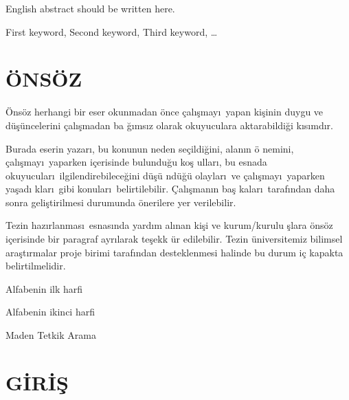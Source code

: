 \documentclass[fleqn,oneside]{akdenizuni}
\theoremstyle{plain}
\theoremstyle{definition}
\newenvironment{onsoz}[1][\"ONS\"OZ]{\chapter*{#1}}{}
\begin{document}
\begin{ozet}[english]
English abstract should be written here.

\begin{labeledminipage}[KEYWORDS:]
First keyword, Second keyword, Third keyword, \dots\ \ 
\end{labeledminipage}
\end{ozet}

\begin{onsoz}
\"{O}ns\"{o}z herhangi bir eser okunmadan \"{o}nce \c{c}al\i \c{s}may\i\
yapan ki\c{s}inin duygu ve d\"{u}\c{s}\"{u}ncelerini \c{c}al\i \c{s}madan ba%
\u{g}\i ms\i z olarak okuyuculara aktarabildi\u{g}i k\i s\i md\i r.

Burada eserin yazar\i , bu konunun neden se\c{c}ildi\u{g}ini, alan\i n \"{o}%
nemini, \c{c}al\i \c{s}may\i\ yaparken i\c{c}erisinde bulundu\u{g}u ko\c{s}%
ullar\i , bu esnada okuyucular\i\ ilgilendirebilece\u{g}ini d\"{u}\c{s}\"{u}%
nd\"{u}\u{g}\"{u} olaylar\i\ ve \c{c}al\i \c{s}may\i\ yaparken ya\c{s}ad\i
klar\i\ gibi konular\i\ belirtilebilir. \c{C}al\i \c{s}man\i n ba\c{s}%
kalar\i\ taraf\i ndan daha sonra geli\c{s}tirilmesi durumunda \"{o}nerilere
yer verilebilir.

Tezin haz\i rlanmas\i\ esnas\i nda yard\i m al\i nan ki\c{s}i ve kurum/kurulu%
\c{s}lara \"{o}ns\"{o}z i\c{c}erisinde bir paragraf ayr\i larak te\c{s}ekk%
\"{u}r edilebilir. Tezin \"{u}niversitemiz bilimsel ara\c{s}t\i rmalar proje
birimi taraf\i ndan desteklenmesi halinde bu durum i\c{c} kapakta
belirtilmelidir.
\end{onsoz}

\begin{glossary}
\item[\protect\underline{\textbf{Simgeler:}}] 

\item[A] Alfabenin ilk harfi

\item[B] Alfabenin ikinci harfi\newline

\item[\protect\underline{\textbf{K\i saltmalar:}} ] 

\item[MTA] Maden Tetkik Arama
\end{glossary}

\chapter{G\.{I}R\.{I}\c{S}}
\end{document}
